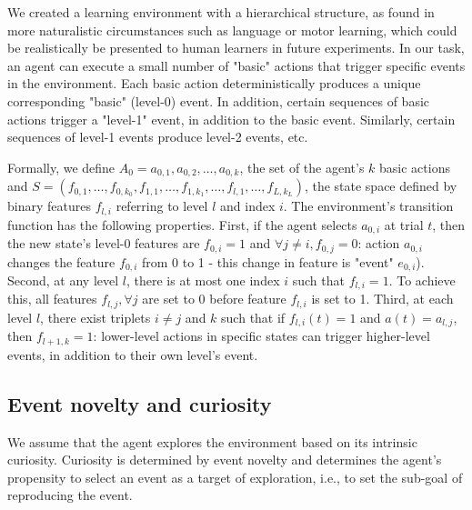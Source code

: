 \documentclass{article}
\begin{document}
We created a learning environment with a hierarchical structure, as found in more naturalistic circumstances such as language or motor learning, which could be realistically be presented to human learners in future experiments. %
In our task, an agent can execute a small number of "basic" actions that trigger specific events in the environment. Each basic action deterministically produces a unique corresponding "basic" (level-0) event. In addition, certain sequences of basic actions trigger a "level-1" event, in addition to the basic event. Similarly, certain sequences of level-1 events produce level-2 events, etc.

Formally, we define $A_0 = a_{0, 1}, a_{0, 2}, \ldots, a_{0, k}$, the set of the agent's $k$ basic actions and $S = {(f_{0, 1}, \ldots, f_{0, k_0}, f_{1, 1}, \ldots, f_{1, k_1}, \ldots, f_{l, 1}, \ldots, f_{L, k_L})}$, the state space defined by binary features $f_{l, i}$ referring to level $l$ and index $i$. The environment's transition function has the following properties. First, if the agent selects $a_{0,i}$ at trial $t$, then the new state's level-0 features are $f_{0,i}=1$ and $\forall j \neq i, f_{0,j}=0$: action $a_{0, i}$ changes the feature $f_{0, i}$ from 0 to 1 - this change in feature is "event" $e_{0, i}$). Second, at any level $l$, there is at most one index $i$ such that $f_{l,i}=1$. To achieve this, all features $f_{l, j}, \forall j$ are set to 0 before feature $f_{l, i}$ is set to 1. Third, at each level $l$, there exist triplets $i \neq j$ and $k$ such that if $f_{l,i}(t)=1$ and $a(t)=a_{l,j}$, then $f_{l+1, k}=1$: lower-level actions in specific states can trigger higher-level events, in addition to their own level's event.


\subsection{Event novelty and curiosity}

We assume that the agent explores the environment based on its intrinsic curiosity. Curiosity is determined by event novelty and determines the agent's propensity to select an event as a target of exploration, i.e., to set the sub-goal of reproducing the event.
\end{document}

